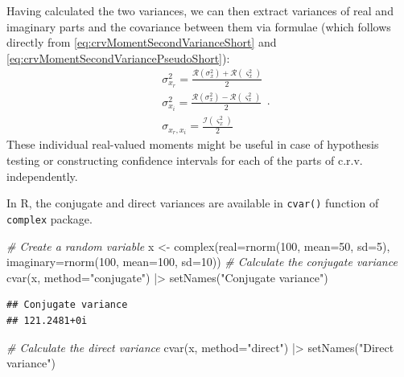 \documentclass[
]{book}
\newenvironment{Shaded}{\begin{snugshade}}{\end{snugshade}}
\newcommand{\AttributeTok}[1]{\textcolor[rgb]{0.77,0.63,0.00}{#1}}
\newcommand{\CommentTok}[1]{\textcolor[rgb]{0.56,0.35,0.01}{\textit{#1}}}
\newcommand{\DecValTok}[1]{\textcolor[rgb]{0.00,0.00,0.81}{#1}}
\newcommand{\FunctionTok}[1]{\textcolor[rgb]{0.00,0.00,0.00}{#1}}
\newcommand{\NormalTok}[1]{#1}
\newcommand{\OtherTok}[1]{\textcolor[rgb]{0.56,0.35,0.01}{#1}}
\newcommand{\SpecialCharTok}[1]{\textcolor[rgb]{0.00,0.00,0.00}{#1}}
\newcommand{\StringTok}[1]{\textcolor[rgb]{0.31,0.60,0.02}{#1}}
\begin{document}
Having calculated the two variances, we can then extract variances of real and imaginary parts and the covariance between them via formulae (which follows directly from \eqref{eq:crvMomentSecondVarianceShort} and \eqref{eq:crvMomentSecondVariancePseudoShort}):
\begin{equation}
    \begin{aligned}
        & \sigma_{x_r}^2 = \frac{\mathcal{R}(\sigma^2_x) + \mathcal{R}(\varsigma^2_x)}{2} \\
        & \sigma_{x_i}^2 = \frac{\mathcal{R}(\sigma^2_x) - \mathcal{R}(\varsigma^2_x)}{2} \\
        & \sigma_{x_r,x_i} = \frac{\mathcal{I}(\varsigma^2_x)}{2}
    \end{aligned} .
    \label{eq:IndividualVariances}
\end{equation}
These individual real-valued moments might be useful in case of hypothesis testing or constructing confidence intervals for each of the parts of c.r.v. independently.

In R, the conjugate and direct variances are available in \texttt{cvar()} function of \texttt{complex} package.

\begin{Shaded}
\begin{Highlighting}[]
\CommentTok{\# Create a random variable}
\NormalTok{x }\OtherTok{\textless{}{-}} \FunctionTok{complex}\NormalTok{(}\AttributeTok{real=}\FunctionTok{rnorm}\NormalTok{(}\DecValTok{100}\NormalTok{, }\AttributeTok{mean=}\DecValTok{50}\NormalTok{, }\AttributeTok{sd=}\DecValTok{5}\NormalTok{),}
             \AttributeTok{imaginary=}\FunctionTok{rnorm}\NormalTok{(}\DecValTok{100}\NormalTok{, }\AttributeTok{mean=}\DecValTok{100}\NormalTok{, }\AttributeTok{sd=}\DecValTok{10}\NormalTok{))}
\CommentTok{\# Calculate the conjugate variance}
\FunctionTok{cvar}\NormalTok{(x, }\AttributeTok{method=}\StringTok{"conjugate"}\NormalTok{) }\SpecialCharTok{|\textgreater{}}
    \FunctionTok{setNames}\NormalTok{(}\StringTok{"Conjugate variance"}\NormalTok{)}
\end{Highlighting}
\end{Shaded}

\begin{verbatim}
## Conjugate variance 
## 121.2481+0i
\end{verbatim}

\begin{Shaded}
\begin{Highlighting}[]
\CommentTok{\# Calculate the direct variance}
\FunctionTok{cvar}\NormalTok{(x, }\AttributeTok{method=}\StringTok{"direct"}\NormalTok{) }\SpecialCharTok{|\textgreater{}}
    \FunctionTok{setNames}\NormalTok{(}\StringTok{"Direct variance"}\NormalTok{)}
\end{Highlighting}
\end{Shaded}
\end{document}
